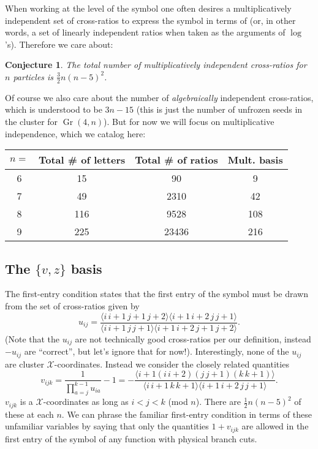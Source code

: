 \documentclass[12pt]{article}
\DeclareMathOperator{\Gr}{Gr}
\def\ket#1{\langle #1 \rangle}
\newtheorem{conjecture}{Conjecture}
\begin{document}
When working at the level of the symbol one often desires a multiplicatively independent set of cross-ratios to express the symbol in terms of (or, in other words, a set of linearly independent ratios when taken as the arguments of $\log$'s). Therefore we care about: 
\begin{conjecture}
The total number of multiplicatively independent cross-ratios for $n$ particles is $\frac{3}{2}n(n-5)^2$. 
\end{conjecture}
Of course we also care about the number of \emph{algebraically} independent cross-ratios, which is understood to be $3n-15$ (this is just the number of unfrozen seeds in the cluster for $\Gr(4,n)$). But for now we will focus on multiplicative independence, which we catalog here:
\begin{table}[h]
\begin{center}
    \begin{tabular}{ c|c|c|c|}
        \cline{1-4}
    \multicolumn{1}{|c|}{$n=$} & Total \# of letters & Total \# of ratios & Mult. basis  \\ \hline
    \multicolumn{1}{|c|}{6}& 15 & 90 & 9   \\ \hline 
    \multicolumn{1}{|c|}{7}& 49 & 2310 & 42 \\ \hline
    \multicolumn{1}{|c|}{8}& 116 & 9528 & 108   \\ \hline
        \multicolumn{1}{|c|}{9}& 225 & 23436 & 216   \\ \hline
    \end{tabular}
\end{center}
\end{table}


\subsection*{The $\{v,z\}$ basis}

The first-entry condition states that the first entry of the symbol must be drawn from the set of cross-ratios given by
\begin{equation}
u_{ij} = \frac{\ket{i\,i{+}1\,j{+}1\,j{+}2} \ket{i{+}1\,i{+}2\,j\,j{+}1}}
{\ket{i\,i{+}1\,j\,j{+}1} \ket{i{+}1\,i{+}2\,j{+}1\,j{+}2}}.
\end{equation}
(Note that the $u_{ij}$ are not technically good cross-ratios per our definition, instead $-u_{ij}$ are ``correct'', but let's ignore that for now!). Interestingly, none of the $u_{ij}$ are cluster $\mathcal{X}$-coordinates. Instead we consider the closely related quantities
\begin{equation}
v_{ijk} = \frac{1}{\prod_{a=j}^{k-1} u_{ia}}-1
=-\frac{\langle i{+}1 (i\,i{+}2)(j\,j{+}1)(k\,k{+}1) \rangle}{\langle i\,i{+}1\,k\,k{+}1\rangle \langle i{+}1\,i{+}2\,j\,j{+}1\rangle}.
\end{equation}
$v_{ijk}$ is a $\mathcal{X}$-coordinates as long as $i<j<k$ (mod $n$). There are $\frac{1}{2}n(n-5)^2$ of these at each $n$. We can phrase the familiar first-entry condition in terms of these unfamiliar variables by saying that only the quantities $1+v_{ijk}$ are allowed in the first entry of the symbol of any function with physical branch cuts.
\end{document}
